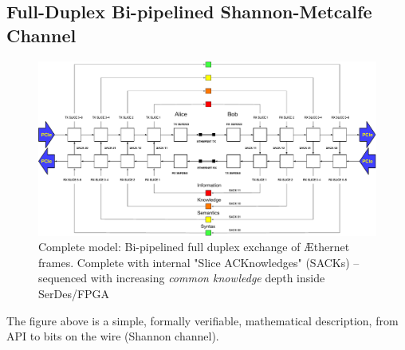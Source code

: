 \documentclass[../../../OAE-SPEC-MAIN.tex]{subfiles}
\begin{document}
\vspace{40px}

\subsection{Full-Duplex Bi-pipelined Shannon-Metcalfe Channel}

\vspace{35px}

\begin{figure}

\includegraphics[width=\textwidth]{FIGURES/Full-Duplex-Bi-Pipelined.pdf}
  \caption{Complete model: Bi-pipelined full duplex exchange of  Æthernet frames. Complete with internal "Slice ACKnowledges" (SACKs) -- sequenced with increasing \emph{common knowledge} depth inside SerDes/FPGA}
\end{figure}

The figure above is a simple, formally verifiable, mathematical description, from API to bits on the wire (Shannon channel). 
\end{document}
